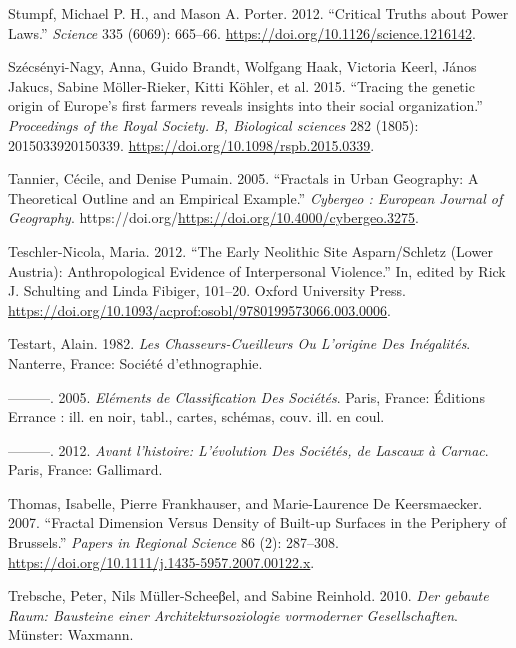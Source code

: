 \documentclass[
  12pt,
  a4paper, twoside]{book}
\newlength{\cslhangindent}
\newlength{\cslentryspacingunit} %
\newenvironment{CSLReferences}[2] %
 {%
  \setlength{\parindent}{0pt}
  \ifodd #1
  \let\oldpar\par
  \def\par{\hangindent=\cslhangindent\oldpar}
  \fi
  \setlength{\parskip}{#2\cslentryspacingunit}
 }%
 {}
\begin{document}
\begin{CSLReferences}{1}{0}
\leavevmode{}%
Stumpf, Michael P. H., and Mason A. Porter. 2012. {``Critical Truths about Power Laws.''} \emph{Science} 335 (6069): 665--66. \url{https://doi.org/10.1126/science.1216142}.

\leavevmode{}%
Szécsényi-Nagy, Anna, Guido Brandt, Wolfgang Haak, Victoria Keerl, János Jakucs, Sabine Möller-Rieker, Kitti Köhler, et al. 2015. {``Tracing the genetic origin of Europe's first farmers reveals insights into their social organization.''} \emph{Proceedings of the Royal Society. B, Biological sciences} 282 (1805): 2015033920150339. \url{https://doi.org/10.1098/rspb.2015.0339}.

\leavevmode{}%
Tannier, Cécile, and Denise Pumain. 2005. {``Fractals in Urban Geography: A Theoretical Outline and an Empirical Example.''} \emph{Cybergeo : European Journal of Geography}. https://doi.org/\url{https://doi.org/10.4000/cybergeo.3275}.

\leavevmode{}%
Teschler-Nicola, Maria. 2012. {``The Early Neolithic Site Asparn/Schletz (Lower Austria): Anthropological Evidence of Interpersonal Violence.''} In, edited by Rick J. Schulting and Linda Fibiger, 101--20. Oxford University Press. \url{https://doi.org/10.1093/acprof:osobl/9780199573066.003.0006}.

\leavevmode{}%
Testart, Alain. 1982. \emph{Les Chasseurs-Cueilleurs Ou L'origine Des Inégalités}. Nanterre, France: Société d'ethnographie.

\leavevmode{}%
---------. 2005. \emph{Eléments de Classification Des Sociétés}. Paris, France: Éditions Errance : ill. en noir, tabl., cartes, schémas, couv. ill. en coul.

\leavevmode{}%
---------. 2012. \emph{Avant l'histoire: L'évolution Des Sociétés, de Lascaux à Carnac}. Paris, France: Gallimard.

\leavevmode{}%
Thomas, Isabelle, Pierre Frankhauser, and Marie-Laurence De Keersmaecker. 2007. {``Fractal Dimension Versus Density of Built-up Surfaces in the Periphery of Brussels.''} \emph{Papers in Regional Science} 86 (2): 287--308. \url{https://doi.org/10.1111/j.1435-5957.2007.00122.x}.

\leavevmode{}%
Trebsche, Peter, Nils Müller-Scheeβel, and Sabine Reinhold. 2010. \emph{Der gebaute Raum: Bausteine einer Architektursoziologie vormoderner Gesellschaften}. Münster: Waxmann.


\end{CSLReferences}
\end{document}
